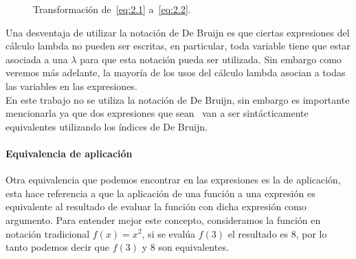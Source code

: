 \begin{figure}
  \centering
  
  \caption{Transformación de~\eqref{eq:2.1} a~\eqref{eq:2.2}.}
\label{fig:DeBruijn-transformation}
\end{figure}

Una desventaja de utilizar la notación de De Bruijn es que ciertas expresiones
del cálculo lambda no pueden ser escritas, en particular, toda variable tiene
que estar asociada a una \(\lambda\) para que esta notación pueda ser utilizada.
Sin embargo como veremos más adelante, la mayoría de los usos del cálculo lambda
asocian a todas las variables en las expresiones.\\

En este trabajo no se utiliza la notación de De Bruijn, sin embargo
es importante mencionarla ya que dos expresiones que sean
\alphacong~van a ser sintácticamente equivalentes utilizando los índices de De
Bruijn.\\

\paragraph{Equivalencia de aplicación}

Otra equivalencia que podemos encontrar en las expresiones es la de aplicación,
esta hace referencia a que la aplicación de una función a una expresión es
equivalente al resultado de evaluar la función con dicha expresión como
argumento. Para entender mejor este concepto, consideramos la función en
notación tradicional \(f(x)=x^2\), si se evalúa \(f(3)\) el resultado es 8, por
lo tanto podemos decir que \(f(3)\) y 8 son equivalentes.\\

